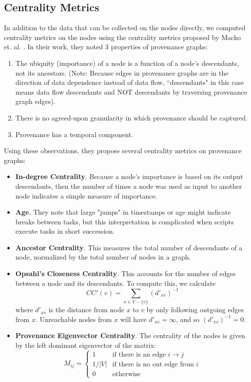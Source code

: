 \documentclass[10pt,twocolumn]{article}
\begin{document}
\subsection{Centrality Metrics}
In addition to the data that can be collected on the nodes directly, we computed centrality metrics on the nodes using the centrality metrics proposed by Macko et. al. \cite{clustering}. In their work, they noted 3 properties of provenance graphs:
\begin{enumerate}
\item The ubiquity (importance) of a node is a function of a node's descendants, not its ancestors. (Note: Because edges in provenance graphs are in the direction of data dependence instead of data flow, ``descendants" in this case means data flow descendants and NOT descendants by traversing provenance graph edges).
\item There is no agreed-upon granularity in which provenance should be captured.
\item Provenance has a temporal component.
\end{enumerate}

Using these observations, they propose several centrality metrics on provenance graphs:
\begin{itemize}
\item \textbf{In-degree Centrality}. Because a node's importance is based on its output descendants, then the number of times a node was used as input to another node indicates a simple measure of importance.
\item \textbf{Age}. They note that large "jumps" in timestamps or age might indicate breaks between tasks, but this interpretation is complicated when scripts execute tasks in short succession.
\item \textbf{Ancestor Centrality}. This measures the total number of descendants of a node, normalized by the total number of nodes in a graph.
\item \textbf{Opsahl's Closeness Centrality}. This accounts for the number of edges between a node and its descendants. To compute this, we calculate
$$CC'(v) = \sum_{x \in V -  \{v\}} (d'_{xv})^{-1}$$
where $d'_{xv}$ is the distance from node $x$ to $v$ by only following outgoing edges from $x$. Unreachable nodes from $x$ will have $d'_{xv} = \infty$, and so $(d'_{xv})^{-1} = 0$.
\item \textbf{Provenance Eigenvector Centrality}. The centrality of the nodes is given by the left dominant eigenvector of the matrix:
$$M_{ij} =
\begin{cases}
1 & \text{if there is an edge } i \to j \\
1/|V| & \text{if there is no out edge from } i \\
0 & \text{otherwise}
\end{cases}
$$
\end{itemize}
\end{document}
